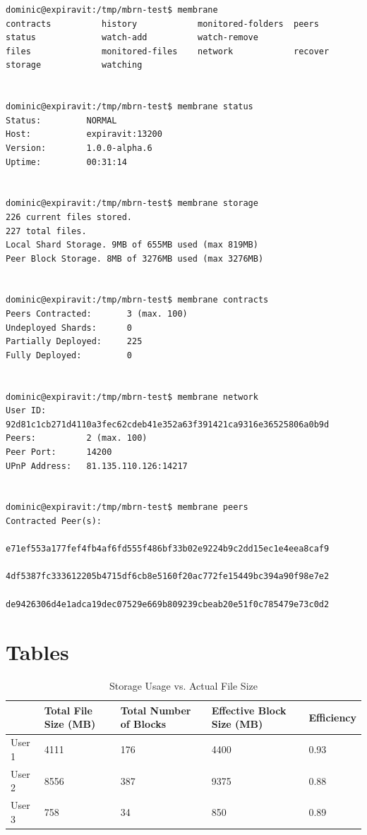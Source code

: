 \documentclass[11pt, a4paper, twocolumn, twoside]{report}
\begin{document}
\begin{lstlisting}[language=RsT, caption=CLI Usage Example, label=lst:cli-status]
dominic@expiravit:/tmp/mbrn-test$ membrane 
contracts          history            monitored-folders  peers              status             watch-add          watch-remove
files              monitored-files    network            recover            storage            watching           


dominic@expiravit:/tmp/mbrn-test$ membrane status 
Status:         NORMAL
Host:           expiravit:13200
Version:        1.0.0-alpha.6
Uptime:         00:31:14


dominic@expiravit:/tmp/mbrn-test$ membrane storage 
226 current files stored.
227 total files.
Local Shard Storage. 9MB of 655MB used (max 819MB)
Peer Block Storage. 8MB of 3276MB used (max 3276MB)


dominic@expiravit:/tmp/mbrn-test$ membrane contracts 
Peers Contracted:       3 (max. 100)
Undeployed Shards:      0
Partially Deployed:     225
Fully Deployed:         0


dominic@expiravit:/tmp/mbrn-test$ membrane network 
User ID:        92d81c1cb271d4110a3fec62cdeb41e352a63f391421ca9316e36525806a0b9d
Peers:          2 (max. 100)
Peer Port:      14200
UPnP Address:   81.135.110.126:14217


dominic@expiravit:/tmp/mbrn-test$ membrane peers 
Contracted Peer(s):
        e71ef553a177fef4fb4af6fd555f486bf33b02e9224b9c2dd15ec1e4eea8caf9
        4df5387fc333612205b4715df6cb8e5160f20ac772fe15449bc394a90f98e7e2
        de9426306d4e1adca19dec07529e669b809239cbeab20e51f0c785479e73c0d2
\end{lstlisting}

\section{Tables}

\begin{table}[h!]
\centering
\label{tab:storageUsage}
\begin{tabular}{|l|l|l|l|l|}
\hline
       & Total File Size (MB) & Total Number of Blocks & Effective Block Size (MB) & Efficiency \\ \hline
User 1 & 4111                 & 176                    & 4400                      & 0.93       \\ \hline
User 2 & 8556                 & 387                    & 9375                      & 0.88       \\ \hline
User 3 & 758                  & 34                     & 850                       & 0.89       \\ \hline
\end{tabular}
\caption{Storage Usage vs. Actual File Size}
\end{table}
\end{document}
